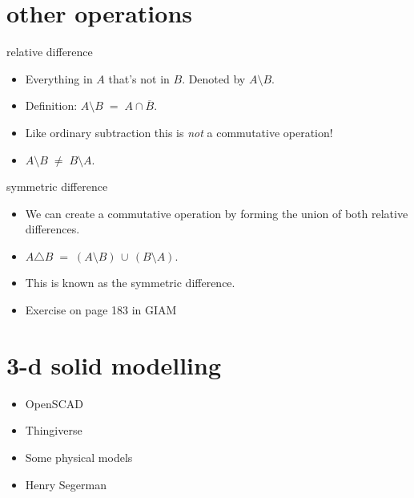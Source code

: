 \documentclass[handout,landscape]{beamer}
\begin{document}
\section{other operations}

\begin{frame}{relative difference}
\begin{itemize}
\item Everything in $A$ that's not in $B$. \pause Denoted by $A \setminus B$.\pause
\item Definition: $A \setminus B \; = \; A \cap \overline{B}$.\pause
\item Like ordinary subtraction this is {\em not} a commutative operation!\pause
\item $A \setminus B \; \neq \; B \setminus A$.
\end{itemize}
\end{frame}

\begin{frame}{symmetric difference}
\begin{itemize}
\item We can create a commutative operation by forming the union of both relative differences. \pause
\item $A \triangle B \; = \; (A \setminus B) \, \cup \, (B \setminus A)$. \pause
\item This is known as the symmetric difference.
\item Exercise on page 183 in GIAM
\end{itemize}
\end{frame}

\section{3-d solid modelling}

\begin{frame}{}
\begin{itemize}
\item OpenSCAD
\item Thingiverse
\item Some physical models
\item Henry Segerman
\end{itemize}
\end{frame}
\end{document}
